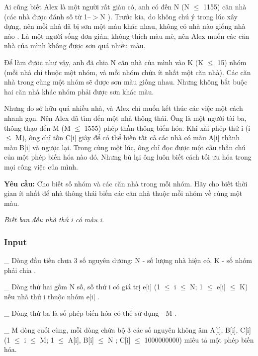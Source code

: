 



   Ai cũng biết Alex là một người rất giàu có, anh có đến   N (N $\le$ 1155)   căn nhà (các nhà được đánh số từ   1--$>$N   ). Trước kia, do không chú ý trong lúc xây dựng,   nên mỗi nhà đã bị sơn một màu khác nhau,   không có nhà nào giống nhà nào . Là một người sống đơn giản, không thích màu mè, nên Alex muốn các căn nhà của mình không được sơn quá nhiều màu.  

   Để làm đươc như vậy, anh đã chia   N   căn nhà của mình vào   \textbf{}K (K $\le$ 15)   nhóm (mỗi nhà chỉ thuộc một nhóm, và mỗi nhóm chứa ít nhất một căn nhà).   Các căn nhà trong cùng một nhóm sẽ được sơn màu giống nhau.   Nhưng không bắt buộc hai căn nhà khác nhóm phải được sơn khác màu.   \emph{
\\}

   Nhưng do sở hữu quá nhiều nhà, và Alex chỉ muốn kết thúc các việc một cách nhanh gọn. Nên Alex đã tìm đến một nhà thông thái. Ông là một người tài ba, thông thạo đến   M (M $\le$ 1555)   phép thần thông biến hóa. Khi xài phép thứ i (i $\le$ M), ông chỉ tốn C[i] giây để có thể   biến tất cả các nhà có màu A[i] thành màu B[i] và ngược lại.   Trong cùng một lúc, ông chỉ đọc được một câu thần chú của một phép biến hóa nào đó.      Nhưng bù lại ông luôn biết cách tối ưu hóa trong mọi công việc của mình.   \emph{
\\}

\textbf{    Yêu cầu:   }   Cho biết số nhóm và các căn nhà trong mỗi nhóm. Hãy cho biết thời gian ít nhất để nhà thông thái biến các căn nhà thuộc mỗi nhóm về cùng một màu.  

\emph{    Biết ban đầu nhà thứ i có màu i.    
\\}

\subsubsection{   Input  }

   \_ Dòng đầu tiến chưa 3 số nguyên dương:   N   - số lượng nhà hiện có,   K   - số nhóm phải chia   .

   \_ Dòng thứ hai gồm   N   số, số thứ i có giá trị   e[i] (1  $\le$  i  $\le$  N; 1  $\le$  e[i]  $\le$  K)   nếu nhà thứ i thuộc nhóm   e[i]   .  

   \_ Dòng thứ ba là số phép biến hóa có thể sử dụng -   M   .  

   \_ M dòng cuối cùng, mỗi dòng chứa bộ 3 các số nguyên không âm   A[i], B[i], C[i] (1  $\le$  i  $\le$  M; 1  $\le$  A[i], B[i]  $\le$  N ; C[i]  $\le$  1000000000)   miêu tả một phép biến hóa.  


